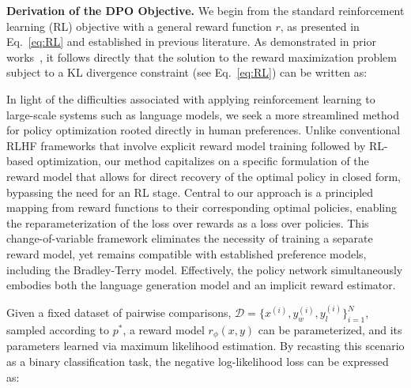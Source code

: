 \textbf{Derivation of the DPO Objective.} We begin from the standard reinforcement learning (RL) objective with a general reward function $r$, as presented in Eq.~\ref{eq:RL} and established in previous literature. As demonstrated in prior works~\citep{peters2007reinforcement, peng2019advantage, korbak2022reinforcement, go2023aligning}, it follows directly that the solution to the reward maximization problem subject to a KL divergence constraint (see Eq.~\ref{eq:RL}) can be written as:

In light of the difficulties associated with applying reinforcement learning to large-scale systems such as language models, we seek a more streamlined method for policy optimization rooted directly in human preferences. Unlike conventional RLHF frameworks that involve explicit reward model training followed by RL-based optimization, our method capitalizes on a specific formulation of the reward model that allows for direct recovery of the optimal policy in closed form, bypassing the need for an RL stage. Central to our approach is a principled mapping from reward functions to their corresponding optimal policies, enabling the reparameterization of the loss over rewards as a loss over policies. This change-of-variable framework eliminates the necessity of training a separate reward model, yet remains compatible with established preference models, including the Bradley-Terry model. Effectively, the policy network simultaneously embodies both the language generation model and an implicit reward estimator.

Given a fixed dataset of pairwise comparisons, $\mathcal{D}=\bigl\{x^{(i)}, y_w^{(i)}, y_l^{(i)}\bigr\}_{i=1}^N$, sampled according to $p^*$, a reward model $r_{\phi}(x, y)$ can be parameterized, and its parameters learned via maximum likelihood estimation. By recasting this scenario as a binary classification task, the negative log-likelihood loss can be expressed as:


